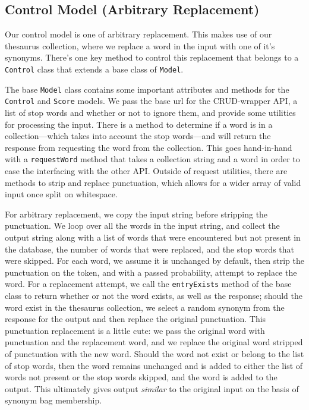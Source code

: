 \documentclass[11pt, twoside, reqno]{book}
\begin{document}
\subsection{Control Model (Arbitrary Replacement)}

Our control model is one of arbitrary replacement. This makes use of our thesaurus collection, where we replace a word in the input with one of it's synonyms. There's one key method to control this replacement that belongs to a \texttt{Control} class that extends a base class of \texttt{Model}.

The base \texttt{Model} class contains some important attributes and methods for the \texttt{Control} and \texttt{Score} models. We pass the base url for the CRUD-wrapper API, a list of stop words and whether or not to ignore them, and provide some utilities for processing the input. There is a method to determine if a word is in a collection—which takes into account the stop words—and will return the response from requesting the word from the collection. This goes hand-in-hand with a \texttt{requestWord} method that takes a collection string and a word in order to ease the interfacing with the other API. Outside of request utilities, there are methods to strip and replace punctuation, which allows for a wider array of valid input once split on whitespace.

For arbitrary replacement, we copy the input string before stripping the punctuation. We loop over all the words in the input string, and collect the output string along with a list of words that were encountered but not present in the database, the number of words that were replaced, and the stop words that were skipped. For each word, we assume it is unchanged by default, then strip the punctuation on the token, and with a passed probability, attempt to replace the word. For a replacement attempt, we call the \texttt{entryExists} method of the base class to return whether or not the word exists, as well as the response; should the word exist in the thesaurus collection, we select a random synonym from the response for the output and then replace the original punctuation. This punctuation replacement is a little cute: we pass the original word with punctuation and the replacement word, and we replace the original word stripped of punctuation with the new word. Should the word not exist or belong to the list of stop words, then the word remains unchanged and is added to either the list of words not present or the stop words skipped, and the word is added to the output. This ultimately gives output \textit{similar} to the original input on the basis of synonym bag membership.
\end{document}
